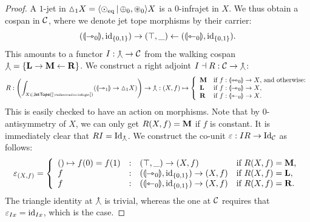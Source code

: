 \documentclass[a4paper]{memoir}
\begin{document}
\begin{proof}
	A $1$-jet in ${\vartriangle}_1 X = \mathopen{}\left\langle {\odot}_{\mathrm{eq}} \,\middle|\, {\oplus}_0, {\oast}_0 \right\rangle\mathclose{} X$ is a $0$-infrajet in $X$.
	We thus obtain a cospan in ${\mathcal{C}}$, where we denote jet tope morphisms by their carrier:
	\[
		({\llparenthesis {\rightarrowtriangle}_0 \rrparenthesis}, \mathrm{id}_{\mathopen{}\left\{ 0, 1 \right\}\mathclose{}}) \to (\top, \_) \leftarrow ({\llparenthesis {\leftarrowtriangle}_0 \rrparenthesis}, \mathrm{id}_{\mathopen{}\left\{ 0, 1 \right\}\mathclose{}}).
	\]
	This amounts to a functor $I : {\curlywedgeuparrow} \to {\mathcal{C}}$ from the walking cospan ${\curlywedgeuparrow} = \mathopen{}\left\{ \mathbf{L} \to \mathbf{M} \leftarrow \mathbf{R} \right\}\mathclose{}$.
	We construct a right adjoint $I \dashv R : {\mathcal{C}} \to {\curlywedgeuparrow}$:
	\[
		R : \paren{
			\int_{X \in \jettope{[\ypolar]}} (\rival{\jetsym_1} \to \cohdisc_1 X)
			} \to \walkingcospan : (X, f) \mapsto 
		\left\{
			\begin{array}{l l}
				\walkingcospanM & \text{if $f : \rival{\equijetsym_0} \to X$, and otherwise:} \\
				\walkingcospanL & \text{if $f : \rival{\jetsym_0} \to X$}, \\
				\walkingcospanR & \text{if $f : \rival{\tejsym_0} \to X$}.
			\end{array}
		\right.
	\]
	This is easily checked to have an action on morphisms.
	Note that by $0$-antisymmetry of $X$, we can only get $R(X, f) = \mathbf{M}$ if $f$ is constant.
	It is immediately clear that $RI = \mathrm{Id}_{\curlywedgeuparrow}$.
	We construct the co-unit $\varepsilon : IR \to \mathrm{Id}_{\mathcal{C}}$ as follows:
	\[
		\varepsilon_{(X, f)} =
		\left\{
			\begin{array}{l c l l}
				() \mapsto f(0) = f(1) &:& (\top, \_) \to (X, f)
				& \text{if $R(X, f) = \mathbf{M}$,} \\
				f &:& ({\llparenthesis {\rightarrowtriangle}_0 \rrparenthesis}, \mathrm{id}_{\mathopen{}\left\{ 0, 1 \right\}\mathclose{}}) \to (X, f)
				& \text{if $R(X, f) = \mathbf{L}$}, \\
				f &:& ({\llparenthesis {\leftarrowtriangle}_0 \rrparenthesis}, \mathrm{id}_{\mathopen{}\left\{ 0, 1 \right\}\mathclose{}}) \to (X, f)
				& \text{if $R(X, f) = \mathbf{R}$}.
			\end{array}
		\right.
	\]
	The triangle identity at ${\curlywedgeuparrow}$ is trivial, whereas the one at ${\mathcal{C}}$ requires that $\varepsilon_{Ix} = \mathrm{id}_{Ix}$, which is the case.
	

\end{proof}
\end{document}
